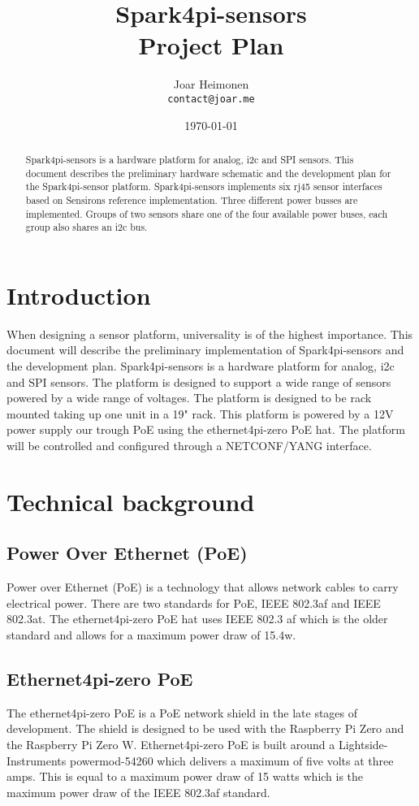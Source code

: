 \documentclass[12pt]{article}
\author{
    Joar Heimonen\\
    \texttt{contact@joar.me}
}
\title{
    \textbf{Spark4pi-sensors}\\[0.5em]
    \large Project Plan
}
\date{\today}
\begin{document}
\maketitle

\begin{abstract}
    \noindent Spark4pi-sensors is a hardware platform for analog, i2c and SPI sensors. 
    This document describes the preliminary hardware schematic and the development plan for the Spark4pi-sensor platform. 
    Spark4pi-sensors implements six rj45 sensor interfaces based on Sensirons reference implementation. 
    Three different power busses are implemented. Groups of two sensors share one of the four available
    power buses, each group also shares an i2c bus.
\end{abstract}

\pagebreak

\tableofcontents

\pagebreak


\section{Introduction}
When designing a sensor platform, universality is of the highest importance. This document will describe the preliminary implementation of Spark4pi-sensors and the development plan.
Spark4pi-sensors is a hardware platform for analog, i2c and SPI sensors. The platform is designed to support a wide range of sensors powered by a wide range of voltages.
The platform is designed to be rack mounted taking up one unit in a 19" rack. This platform is powered by a 12V power supply our trough PoE using the ethernet4pi-zero PoE hat.
The platform will be controlled and configured through a NETCONF/YANG interface. 


\section{Technical background}
\subsection{Power Over Ethernet (PoE)}
Power over Ethernet (PoE) is a technology that allows network cables to carry electrical power. 
There are two standards for PoE, IEEE 802.3af and IEEE 802.3at. The ethernet4pi-zero PoE hat uses IEEE 802.3 af which 
is the older standard and allows for a maximum power draw of 15.4w.

\subsection{Ethernet4pi-zero PoE}
The ethernet4pi-zero PoE is a PoE network shield in the late stages of development.
The shield is designed to be used with the Raspberry Pi Zero and the Raspberry Pi Zero W.
Ethernet4pi-zero PoE is built around a Lightside-Instruments powermod-54260 which delivers a maximum of five volts at three amps.
This is equal to a maximum power draw of 15 watts which is the maximum power draw of the IEEE 802.3af standard.
\end{document}

